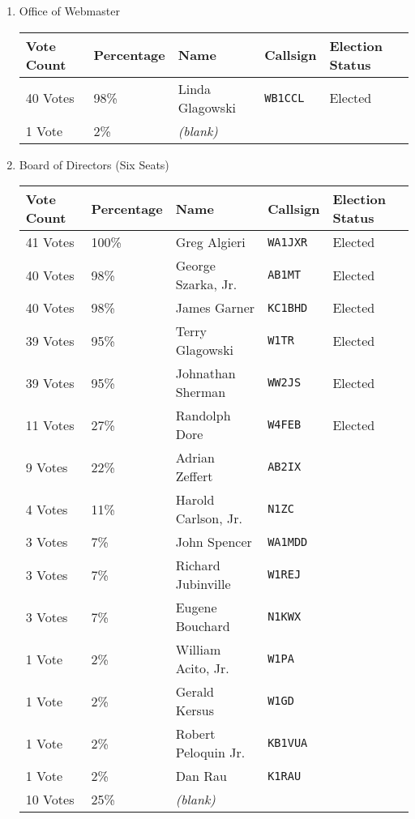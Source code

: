 \documentclass[10pt,letterpaper]{article}
\begin{document}
\begin{enumerate}
\item Office of Webmaster\\
\begin{tabular}{|l|l|l|l|l|}
\hline
\textbf{Vote Count} & \textbf{Percentage} & \textbf{Name} & \textbf{Callsign} & \textbf{Election Status} \\
\hline
40 Votes & 98\% & Linda Glagowski & \texttt{WB1CCL} & Elected \\
\hline
1 Vote & 2\% & \emph{(blank)} & &  \\
\hline
\end{tabular}
\item Board of Directors (Six Seats)\\
\begin{tabular}{|l|l|l|l|l|}
\hline %
\textbf{Vote Count} & \textbf{Percentage} & \textbf{Name} & \textbf{Callsign} & \textbf{Election Status} \\
\hline
41 Votes & 100\% & Greg Algieri & \texttt{WA1JXR} & Elected \\
40 Votes & 98\% & George Szarka, Jr. & \texttt{AB1MT} & Elected \\
40 Votes & 98\% & James Garner & \texttt{KC1BHD} & Elected \\
39 Votes & 95\% & Terry Glagowski & \texttt{W1TR} & Elected \\
39 Votes & 95\% & Johnathan Sherman & \texttt{WW2JS} & Elected \\
11 Votes & 27\% & Randolph Dore & \texttt{W4FEB} & Elected \\
9 Votes & 22\% & Adrian Zeffert & \texttt{AB2IX} &  \\
4 Votes & 11\% & Harold Carlson, Jr. & \texttt{N1ZC} & \\
3 Votes & 7\% & John Spencer & \texttt{WA1MDD} & \\
3 Votes & 7\% & Richard Jubinville & \texttt{W1REJ} & \\
3 Votes & 7\% & Eugene Bouchard & \texttt{N1KWX} & \\
1 Vote & 2\% & William Acito, Jr. & \texttt{W1PA} & \\
1 Vote & 2\% & Gerald Kersus & \texttt{W1GD} & \\
1 Vote & 2\% & Robert Peloquin Jr. & \texttt{KB1VUA} & \\
1 Vote & 2\% & Dan Rau & \texttt{K1RAU} & \\
\hline
10 Votes & 25\% & \emph{(blank)} & &  \\

\hline
\end{tabular}
\end{enumerate}
\end{document}
